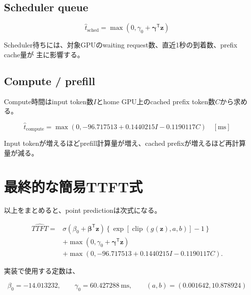 \documentclass[a4paper,11pt]{ltjsarticle}
\begin{document}
\subsection{Scheduler queue}

\begin{equation}
\boxed{
\hat{t}_{\mathrm{sched}}
=
\max\!\left(
0,\gamma_0+\boldsymbol{\gamma}^{\mathsf T}\boldsymbol{z}
\right)
}
\end{equation}

Scheduler待ちには、対象GPUのwaiting request数、直近1秒の到着数、prefix cache量が
主に影響する。

\subsection{Compute / prefill}

Compute時間はinput token数$I$とhome GPU上のcached prefix token数$C$から求める。

\begin{equation}
\boxed{
\hat{t}_{\mathrm{compute}}
=
\max\!\left(
0,
-96.717513
+0.1440215 I
-0.1190117 C
\right)
\quad [\mathrm{ms}]
}
\end{equation}

Input tokenが増えるほどprefill計算量が増え、cached prefixが増えるほど再計算量が減る。

\section{最終的な簡易TTFT式}

以上をまとめると、point predictionは次式になる。

\begin{equation}
\boxed{
\begin{aligned}
\widehat{TTFT}
={}&
\sigma\!\left(
\beta_0+\boldsymbol{\beta}^{\mathsf T}\boldsymbol{z}
\right)
\left\{
\exp\!\left[
\operatorname{clip}\!\left(g(\boldsymbol{z}),a,b\right)
\right]-1
\right\} \\
&+
\max\!\left(
0,\gamma_0+\boldsymbol{\gamma}^{\mathsf T}\boldsymbol{z}
\right) \\
&+
\max\!\left(
0,-96.717513+0.1440215I-0.1190117C
\right).
\end{aligned}
}
\end{equation}

実装で使用する定数は、

\begin{equation}
\beta_0=-14.013232,
\qquad
\gamma_0=60.427288\ \mathrm{ms},
\qquad
(a,b)=(0.001642,10.878924)
\end{equation}
\end{document}

